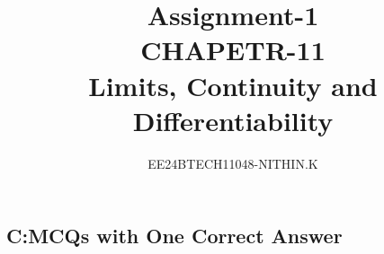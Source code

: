 \documentclass[journal,12pt,twocolumn]{IEEEtran}
\theoremstyle{remark}
\begin{document}


\title{Assignment-1\\CHAPETR-11\\Limits, Continuity and Differentiability}
\author{EE24BTECH11048-NITHIN.K} 
\maketitle
\newpage
\bigskip

\renewcommand{\thefigure}{\theenumi}
\renewcommand{\thetable}{\theenumi}

\begin{enumerate}

\section{C:MCQs with One Correct Answer}


\end{enumerate}
\end{document}
